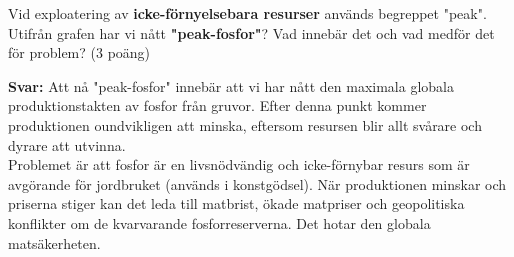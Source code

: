 \documentclass{exam}
\begin{document}
\begin{questions}
\question Vid exploatering av \textbf{icke-förnyelsebara resurser} används begreppet "peak". Utifrån grafen har vi nått \textbf{"peak-fosfor"}? Vad innebär det och vad medför det för problem? (3 poäng)

\textbf{Svar:} Att nå "peak-fosfor" innebär att vi har nått den maximala globala produktionstakten av fosfor från gruvor. Efter denna punkt kommer produktionen oundvikligen att minska, eftersom resursen blir allt svårare och dyrare att utvinna. \\
Problemet är att fosfor är en livsnödvändig och icke-förnybar resurs som är avgörande för jordbruket (används i konstgödsel). När produktionen minskar och priserna stiger kan det leda till matbrist, ökade matpriser och geopolitiska konflikter om de kvarvarande fosforreserverna. Det hotar den globala matsäkerheten.

\end{questions}
\end{document}
